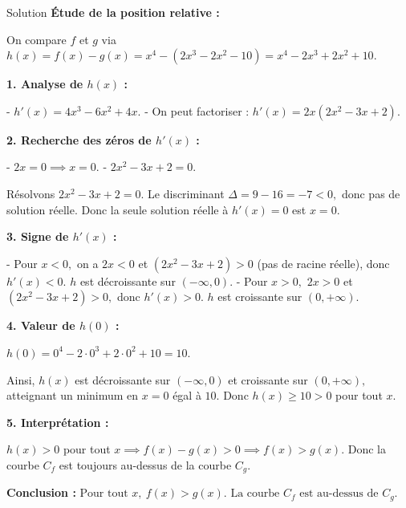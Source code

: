 \documentclass[a4paper,12pt]{article}
\begin{document}
\begin{solutionbox}{Solution}
\textbf{Étude de la position relative :}

On compare $f$ et $g$ via $h(x)=f(x)-g(x)=x^4 - (2x^3-2x^2-10)=x^4 -2x^3+2x^2+10.$

\textbf{1. Analyse de $h(x)$ :}

- $h'(x)=4x^3 -6x^2 +4x.$
- On peut factoriser : $h'(x)=2x(2x^2 -3x+2).$

\textbf{2. Recherche des zéros de $h'(x)$ :}

- $2x=0 \implies x=0.$
- $2x^2-3x+2=0.$

Résolvons $2x^2-3x+2=0.$ Le discriminant $\Delta=9-16= -7<0,$ donc pas de solution réelle.  
Donc la seule solution réelle à $h'(x)=0$ est $x=0.$

\textbf{3. Signe de $h'(x)$ :}

- Pour $x<0,$ on a $2x<0$ et $(2x^2-3x+2)>0$ (pas de racine réelle), donc $h'(x)<0.$ $h$ est décroissante sur $(-\infty,0).$
- Pour $x>0,$ $2x>0$ et $(2x^2-3x+2)>0,$ donc $h'(x)>0.$ $h$ est croissante sur $(0,+\infty).$

\textbf{4. Valeur de $h(0)$ :}

$h(0)=0^4-2\cdot0^3+2\cdot0^2+10=10.$

Ainsi, $h(x)$ est décroissante sur $(-\infty,0)$ et croissante sur $(0,+\infty),$ atteignant un minimum en $x=0$ égal à $10.$ Donc $h(x)\ge10>0$ pour tout $x.$

\textbf{5. Interprétation :}

$h(x)>0$ pour tout $x \implies f(x)-g(x)>0 \implies f(x)>g(x).$  
Donc la courbe $C_f$ est toujours au-dessus de la courbe $C_g.$

\textbf{Conclusion :}  
$\boxed{\text{Pour tout }x,\ f(x)>g(x)\text{. La courbe }C_f\text{ est au-dessus de }C_g\text{.}}$
\end{solutionbox}
\end{document}

